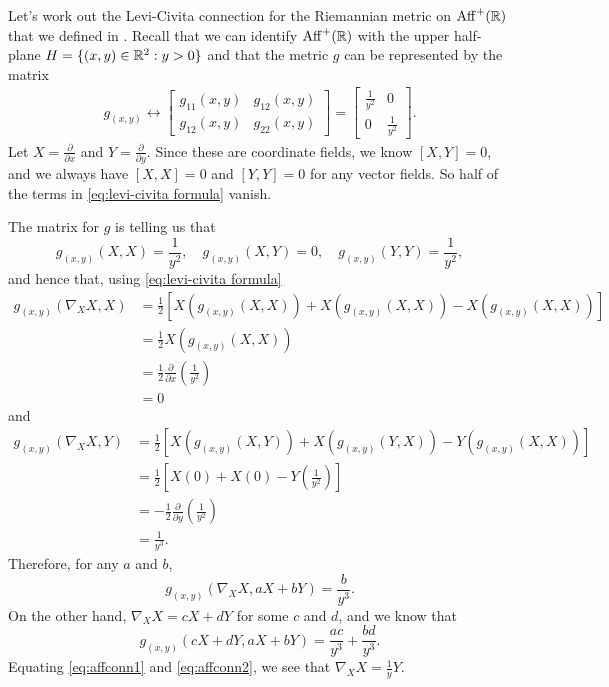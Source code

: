\begin{example}\label{ex:hyperbolic plane connection}
	Let's work out the Levi-Civita connection for the Riemannian metric on $\operatorname{Aff}^+(\mathbb{R})$ that we defined in . Recall that we can identify $\operatorname{Aff}^+(\mathbb{R})$ with the upper half-plane $H = \{(x,y) \in \mathbb{R}^2 : y > 0\}$ and that the metric $g$ can be represented by the matrix
	\begin{align*}
		g_{(x,y)} \leftrightarrow \begin{bmatrix} g_{11}(x,y) & g_{12}(x,y) \\ g_{12}(x,y) & g_{22}(x,y) \end{bmatrix} = \begin{bmatrix} \frac{1}{y^2} & 0 \\ 0 & \frac{1}{y^2} \end{bmatrix}.
	\end{align*}
	Let $X = \frac{\partial}{\partial x}$ and $Y = \frac{\partial}{\partial y}$. Since these are coordinate fields, we know $[X,Y] = 0$, and we always have $[X,X] = 0$ and $[Y,Y] = 0$ for any vector fields. So half of the terms in \eqref{eq:levi-civita formula} vanish. 
	
	The matrix for $g$ is telling us that
	\[
		g_{(x,y)}(X,X) = \frac{1}{y^2}, \quad g_{(x,y)}(X,Y) = 0, \quad g_{(x,y)}(Y,Y) = \frac{1}{y^2},
	\]
	and hence that, using \eqref{eq:levi-civita formula}
	\begin{align*}
		g_{(x,y)}(\nabla_X X,X) & = \frac{1}{2}\left[ X(g_{(x,y)}(X,X)) + X(g_{(x,y)}(X,X)) - X(g_{(x,y)}(X,X))\right] \\
		& = \frac{1}{2}X(g_{(x,y)}(X,X)) \\
		& = \frac{1}{2} \frac{\partial}{\partial x}\left(\frac{1}{y^2}\right) \\
		& = 0
	\end{align*}
	and
	\begin{align*}
		g_{(x,y)}(\nabla_X X,Y) & = \frac{1}{2}\left[ X(g_{(x,y)}(X,Y)) + X(g_{(x,y)}(Y,X)) - Y(g_{(x,y)}(X,X))\right] \\
		& = \frac{1}{2}\left[X(0) + X(0) - Y\left(\frac{1}{y^2}\right)\right] \\
		& = -\frac{1}{2} \frac{\partial}{\partial y}\left(\frac{1}{y^2}\right) \\
		& = \frac{1}{y^3}.
	\end{align*}
	Therefore, for any $a$ and $b$,
	\begin{equation}\label{eq:affconn1}
		g_{(x,y)}(\nabla_X X,aX+bY) = \frac{b}{y^3}.
	\end{equation}
	On the other hand, $\nabla_X X = cX+dY$ for some $c$ and $d$, and we know that
	\begin{equation}\label{eq:affconn2}
		g_{(x,y)}(cX+dY,aX+bY) = \frac{ac}{y^3} + \frac{bd}{y^3}.
	\end{equation}
	Equating \eqref{eq:affconn1} and \eqref{eq:affconn2}, we see that $\nabla_XX = \frac{1}{y}Y$.
	

\end{example}
